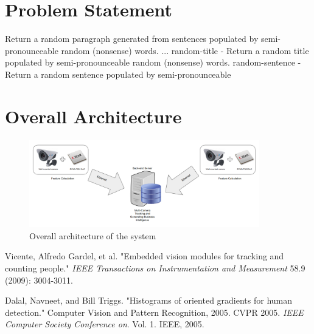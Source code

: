 \documentclass[12pt,a4paper]{article}
\begin{document}
\tableofcontents
\newpage
{}
\setcounter{page}{1}
\section{\textbf{Problem Statement}}
Return a random paragraph generated from sentences populated by semi-pronounceable random (nonsense) words. ... random-title - Return a random title populated by semi-pronounceable random (nonsense) words. random-sentence - Return a random sentence populated by semi-pronounceable 






\section{\textbf{Overall Architecture}} 

\begin{figure}[h]
\includegraphics[width=10cm]{architecture.png}
\centering
\caption{Overall architecture of the system}
\label{f2}
\end{figure}



\newpage
\begin{thebibliography}{7}

Vicente, Alfredo Gardel, et al. "Embedded vision modules for tracking and counting people." \textit{IEEE Transactions on Instrumentation and Measurement} 58.9 (2009): 3004-3011.

Dalal, Navneet, and Bill Triggs. "Histograms of oriented gradients for human detection." Computer Vision and Pattern Recognition, 2005. CVPR 2005. \textit{IEEE Computer Society Conference on}. Vol. 1. IEEE, 2005.

\end{thebibliography}
\end{document}
